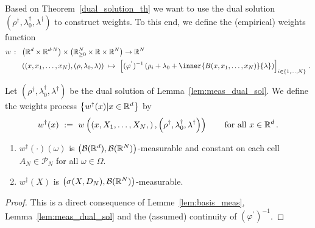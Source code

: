 Based on Theorem~\ref{dual_solution_th}
we want to use the dual 
solution 
$
\left( \rho^\dagger,\lambda_0^\dagger,\lambda^\dagger \right)
$
to construct weights.
To this end, we define the (empirical) weights function
\begin{align*}
 w\ \colon\
 &
 \left( 
  \R^d\times \R^{d\cdot N}
 \right)
  \times
  \left( 
\R^N_{\ge 0}\times \R\times \R^N
  \right)
  \to
  \R^N
  \\
 &
  \left( 
  (x,x_1,\ldots,x_N),(\rho,\lambda_0,\lambda)
  \right)
  \ 
  \mapsto
  \ 
  \left[ 
  (\varphi^{'})^{-1}
  \left( 
    \rho_i
    +
    \lambda_0
    +
    \inner
    {B(x,x_1,\ldots,x_N)}
    {\lambda}
  \right)
\right]_{i\in \left\{ 1,\ldots,N \right\}}
\,.
\end{align*}
\begin{definition}
  Let 
  $
\left( \rho^\dagger,\lambda_0^\dagger,\lambda^\dagger \right)
  $
  be the dual solution of Lemma~\ref{lem:meas_dual_sol}.
  We define the weights process 
  $\left\{ w^\dagger(x) | x\in\mathbb{R}^d\right\}$
  by
  \begin{align*}
    w^\dagger(x) 
    \ 
    :=
    \ 
    w
    \left( 
    \left( 
    x,X_1,\ldots,X_N,
    \right)
    ,
\left( \rho^\dagger,\lambda_0^\dagger,\lambda^\dagger \right)
    \right)
    \qquad
    \text{for all}\ 
    x\in\R^d
    \,.
  \end{align*}
\end{definition}
\begin{lemma}
  \label{lem:weights:meas}
  \quad
  \begin{enumerate}[label=(\roman*)]
\item
  $w^\dagger(\cdot)(\omega)$ is 
  $\left(
    \mathcal{B}(\mathbb{R}^d),\mathcal{B}(\mathbb{R}^N)
  \right)$-measurable
  and
  constant on each cell 
  $A_N\in\mathcal{P}_N$
  for all $\omega\in\Omega$. 
\item
  $w^\dagger(X)$ is $\left(
    \sigma(X,D_N),\mathcal{B}(\mathbb{R}^N)
  \right)$-measurable. 
  \end{enumerate}
\end{lemma}
\begin{proof}
  This is a direct consequence of Lemme~\ref{lem:basis_meas}, Lemma~\ref{lem:meas_dual_sol}
  and 
  the (assumed) continuity of $(\varphi^{'})^{-1}$.
\end{proof}


